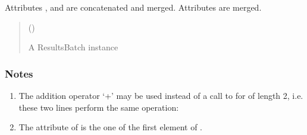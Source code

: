 \documentclass[letterpaper,10pt,english]{sphinxmanual}
\begin{document}
\begin{fulllineitems}
\begin{fulllineitems}
\sphinxAtStartPar
Attributes ,  and  are concatenated and merged.
Attributes  are merged.
\begin{quote}\begin{description}
\sphinxAtStartPar
{} () \textendash{} 

\sphinxAtStartPar
{} \textendash{} A ResultsBatch instance

\sphinxAtStartPar
{\hyperref[\detokenize{generated/tamos.data_IO.ResultsBatch:tamos.data_IO.ResultsBatch}]{}}

\end{description}\end{quote}
\subsubsection*{Notes}
\begin{enumerate}
%
\item {} 
\sphinxAtStartPar
The addition operator ‘+’ may be used instead of a call to  for  of length 2,
i.e. these two lines perform the same operation:

\begin{sphinxVerbatim}[commandchars=\\\{\}]
\PYG{p}{[} \PYG{p}{]}
  
\end{sphinxVerbatim}

\item {} 
\sphinxAtStartPar
The  attribute of  is the one of the first element of .

\end{enumerate}

\end{fulllineitems}



\end{fulllineitems}
\end{document}
